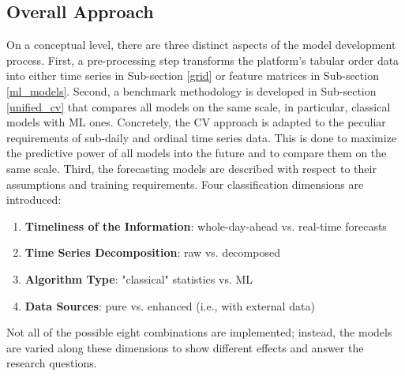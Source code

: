 \subsection{Overall Approach}
\label{approach_approach}

On a conceptual level, there are three distinct aspects of the model
    development process.
First, a pre-processing step transforms the platform's tabular order data into
    either time series in Sub-section \ref{grid} or feature matrices in
    Sub-section \ref{ml_models}.
Second, a benchmark methodology is developed in Sub-section \ref{unified_cv}
    that compares all models on the same scale, in particular, classical
    models with ML ones.
Concretely, the CV approach is adapted to the peculiar requirements of
    sub-daily and ordinal time series data.
This is done to maximize the predictive power of all models into the future
    and to compare them on the same scale.
Third, the forecasting models are described with respect to their assumptions
    and training requirements.
Four classification dimensions are introduced:
\begin{enumerate}
\item \textbf{Timeliness of the Information}:
    whole-day-ahead vs. real-time forecasts
\item \textbf{Time Series Decomposition}: raw vs. decomposed
\item \textbf{Algorithm Type}: "classical" statistics vs. ML
\item \textbf{Data Sources}: pure vs. enhanced (i.e., with external data)
\end{enumerate}
Not all of the possible eight combinations are implemented; instead, the
    models are varied along these dimensions to show different effects and
    answer the research questions.
